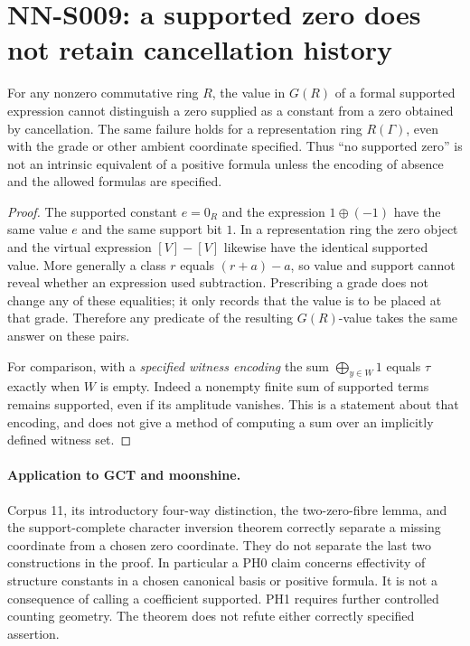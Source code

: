 \section{NN-S009: a supported zero does not retain cancellation history}
\label{sec:NN-S009}

\begin{theorem}[NN-S009]
For any nonzero commutative ring $R$, the value in $G(R)$ of a
formal supported expression cannot distinguish a zero supplied
as a constant from a zero obtained by cancellation. The same
failure holds for a representation ring $R(\Gamma)$, even with
the grade or other ambient coordinate specified. Thus
``no supported zero'' is not an intrinsic equivalent of a
positive formula unless the encoding of absence and the allowed
formulas are specified.
\end{theorem}

\begin{proof}
The supported constant $e=0_R$ and the expression
$1\mathbin\oplus(-1)$ have the same value $e$ and the same
support bit $1$. In a representation ring the zero object and
the virtual expression $[V]-[V]$ likewise have the identical
supported value. More generally a class $r$ equals
$(r+a)-a$, so value and support cannot reveal whether an
expression used subtraction. Prescribing a grade does not change
any of these equalities; it only records that the value is to be
placed at that grade. Therefore any predicate of the resulting
$G(R)$-value takes the same answer on these pairs.

For comparison, with a \emph{specified witness encoding} the sum
$\bigoplus_{y\in W}1$ equals $\tau$ exactly when $W$ is empty.
Indeed a nonempty finite sum of supported terms remains supported,
even if its amplitude vanishes. This is a statement about that
encoding, and does not give a method of computing a sum over an
implicitly defined witness set.
\end{proof}

\paragraph{Application to GCT and moonshine.}
Corpus 11, its introductory four-way distinction, the two-zero-fibre
lemma, and the support-complete character inversion theorem correctly
separate a missing coordinate from a chosen zero coordinate.
They do not separate the last two constructions in the proof.
In particular a PH0 claim concerns effectivity of structure
constants in a chosen canonical basis or positive formula.
It is not a consequence of calling a coefficient supported.
PH1 requires further controlled counting geometry. The theorem
does not refute either correctly specified assertion.

